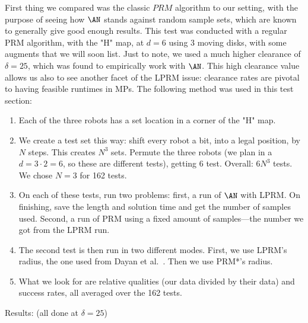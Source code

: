  First thing we compared was the classic $PRM$ algorithm to our setting, with the purpose of seeing how $\AN$ stands against random sample sets, which are known to generally give good enough results. This test was conducted with a regular PRM algorithm, with the "H" map, at $d=6$ using 3 moving disks, with some augments that we will soon list. Just to note, we used a much higher clearance of $\delta=25$, which was found to empirically work with $\AN$. This high clearance value allows us also to see another facet of the LPRM issue: clearance rates are pivotal to having feasible runtimes in MPs. The following method was used in this test section:
 \begin{enumerate}
     \item Each of the three robots has a set location in a corner of the "H" map. 
     \item We create a test set this way: shift every robot a bit, into a legal position, by $N$ steps. This creates $N^3$ sets. Permute the three robots (we plan in a $d=3\cdot2=6$, so these are different tests), getting 6 test. Overall: $6N^3$ tests. We chose $N=3$ for 162 tests.
     \item On each of these tests, run two problems: first, a run of $\AN$ with LPRM. On finishing, save the length and solution time and get the number of samples used. Second, a run of PRM using a fixed amount of samples---the number we got from the LPRM run.
     \item The second test is then run in two different modes. First, we use LPRM's radius, the one used from Dayan et al.~\cite{dayan2023near}. Then we use PRM*'s radius. 
     \item What we look for are relative qualities (our data divided by their data) and success rates, all averaged over the 162 tests.
 \end{enumerate}
 Results: (all done at $\delta=25$)
